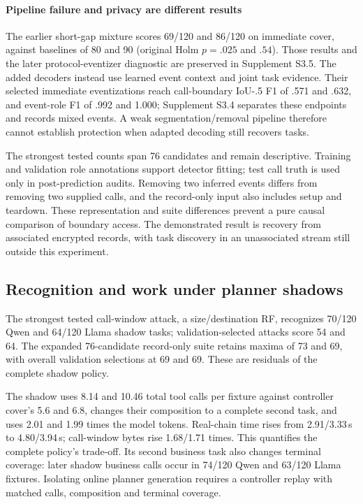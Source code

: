 \paragraph{Pipeline failure and privacy are different results}
The earlier short-gap mixture scores 69/120 and 86/120 on immediate cover, against baselines of 80 and 90 (original Holm $p=.025$ and $.54$). Those results and the later protocol-eventizer diagnostic are preserved in Supplement S3.5. The added decoders instead use learned event context and joint task evidence. Their selected immediate eventizations reach call-boundary IoU-.5 F1 of .571 and .632, and event-role F1 of .992 and 1.000; Supplement S3.4 separates these endpoints and records mixed events. A weak segmentation/removal pipeline therefore cannot establish protection when adapted decoding still recovers tasks.

The strongest tested counts span 76 candidates and remain descriptive. Training and validation role annotations support detector fitting; test call truth is used only in post-prediction audits. Removing two inferred events differs from removing two supplied calls, and the record-only input also includes setup and teardown. These representation and suite differences prevent a pure causal comparison of boundary access. The demonstrated result is recovery from associated encrypted records, with task discovery in an unassociated stream still outside this experiment.

\subsection{Recognition and work under planner shadows}\label{sec:shadow}
The strongest tested call-window attack, a size/destination RF, recognizes 70/120 Qwen and 64/120 Llama shadow tasks; validation-selected attacks score 54 and 64. The expanded 76-candidate record-only suite retains maxima of 73 and 69, with overall validation selections at 69 and 69. These are residuals of the complete shadow policy.

The shadow uses 8.14 and 10.46 total tool calls per fixture against controller cover's 5.6 and 6.8, changes their composition to a complete second task, and uses 2.01 and 1.99 times the model tokens. Real-chain time rises from 2.91/3.33\,s to 4.80/3.94\,s; call-window bytes rise 1.68/1.71 times. This quantifies the complete policy's trade-off. Its second business task also changes terminal coverage: later shadow business calls occur in 74/120 Qwen and 63/120 Llama fixtures. Isolating online planner generation requires a controller replay with matched calls, composition and terminal coverage.

